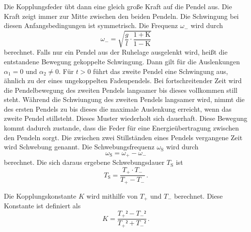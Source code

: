 Die Kopplungsfeder übt dann eine gleich große Kraft auf die Pendel aus. Die Kraft zeigt immer zur Mitte zwischen den beiden Pendeln. 
Die Schwingung bei diesen Anfangsbedingungen ist symmetrisch.
Die Frequenz $\omega_-$ wird durch
\begin{equation}
    \omega_- = \sqrt{\frac{g}{l} \cdot \frac{1 + \text{K}}{1 - \text{K}}}
    \label{eqn:OmegaGegensinnig}
\end{equation}
berechnet. 
Falls nur ein Pendel aus der Ruhelage ausgelenkt wird, heißt die entstandene Bewegung gekoppelte Schwingung. Dann gilt für 
die Auslenkungen $\alpha_1 = 0$ und $\alpha_2 \neq 0$. 
Für $t > 0$ führt das zweite Pendel eine Schwingung aus, ähnlich zu der eines ungekoppelten Fadenpendels. Bei fortschreitender Zeit wird die Pendelbewegung des 
zweiten Pendels langsamer bis dieses vollkommen still steht. Während die Schwiungung des zweiten Pendels langsamer wird, nimmt die des ersten Pendels zu bis dieses die 
maximale Auslenkung erreicht, wenn das zweite Pendel stillsteht. Dieses Muster wiederholt sich dauerhaft. Diese Bewegung kommt dadurch zustande, dass 
die Feder für eine Energieübertragung zwischen den Pendeln sorgt. Die zwischen zwei Stillständen eines Pendels vergangene Zeit wird Schwebung genannt.
Die Schwebungsfrequenz $\omega_{\text{S}}$ wird durch 
\begin{equation}
    \omega_{\text{S}} =  \omega_+ - \omega_-
    \label{eqn:OmegaSchwebung}
\end{equation}
berechnet. Die sich daraus ergebene Schwebungsdauer $T_{\text{S}}$ ist
\begin{equation}
    T_{\text{S}} =  \frac{T_+ \cdot T_-}{T_+ - T_-}\,.
    \label{eqn:TSchwebung}
\end{equation}

Die Kopplungskonstante $K$ wird mithilfe von $T_+$ und $T_-$ berechnet. Diese Konstante ist definiert als 
\begin{equation}
    K = \frac{T_{+}² - T_{-}²}{T_{+}² + T_{-}²}\, .
    \label{eqn:Kopplungskonstante}
\end{equation}

